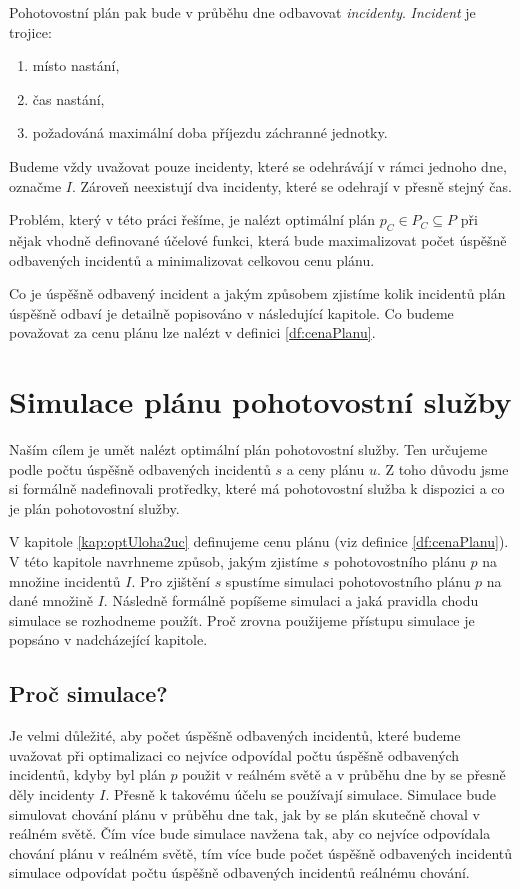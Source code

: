 Pohotovostní plán pak bude v průběhu dne odbavovat \textit{incidenty}.
\textit{Incident} je trojice:
\begin{enumerate}
  \item místo nastání,
  \item čas nastání,
  \item požadováná maximální doba příjezdu záchranné jednotky.
\end{enumerate}
Budeme vždy uvažovat pouze incidenty, které se odehrávájí v rámci jednoho dne, označme $I$.
Zároveň neexistují dva incidenty, které se odehrají v přesně stejný čas.

Problém, který v této práci řešíme, je nalézt optimální plán $p_C \in P_C \subseteq P$ při nějak vhodně definované účelové funkci,
která bude maximalizovat počet úspěšně odbavených incidentů a minimalizovat celkovou cenu plánu.

Co je úspěšně odbavený incident a jakým způsobem zjistíme kolik incidentů plán úspěšně odbaví je detailně popisováno v následující kapitole. 
Co budeme považovat za cenu plánu lze nalézt v definici \ref{df:cenaPlanu}.

\section{Simulace plánu pohotovostní služby}\label{SimulaceKap}

Naším cílem je umět nalézt optimální plán pohotovostní služby.
Ten určujeme podle počtu úspěšně odbavených incidentů $s$ a ceny plánu $u$.
Z toho důvodu jsme si formálně nadefinovali protředky, které má pohotovostní služba k dispozici a co je plán pohotovostní služby.

V kapitole \ref{kap:optUloha2uc} definujeme cenu plánu (viz definice \ref{df:cenaPlanu}).
V této kapitole navrhneme způsob, jakým zjistíme $s$ pohotovostního plánu $p$ na množine incidentů $I$.
Pro zjištění $s$ spustíme simulaci pohotovostního plánu $p$ na dané množině $I$.
Následně formálně popíšeme simulaci a jaká pravidla chodu simulace se rozhodneme použít.
Proč zrovna použijeme přístupu simulace je popsáno v nadcházející kapitole.

\subsection{Proč simulace?}\label{kap:procSimulace}

Je velmi důležité, aby počet úspěšně odbavených incidentů, které budeme uvažovat při optimalizaci co nejvíce odpovídal počtu úspěšně odbavených incidentů,
kdyby byl plán $p$ použit v reálném světě a v průběhu dne by se přesně děly incidenty $I$.
Přesně k takovému účelu se používají simulace.
Simulace bude simulovat chování plánu v průběhu dne tak, jak by se plán skutečně choval v reálném světě.
Čím více bude simulace navžena tak, aby co nejvíce odpovídala chování plánu v reálném světě, tím více bude počet úspěšně odbavených incidentů simulace odpovídat
počtu úspěšně odbavených incidentů reálnému chování.

